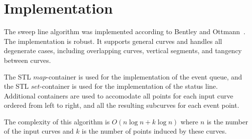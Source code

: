 \section{Implementation}

The sweep line algorithm was implemented according to Bentley and
Ottmann~\cite{bkos-cgaa-97}. The implementation is robust. It supports general
curves and handles all degenerate cases, including overlapping curves,
vertical segments, and tangency between curves.

The STL $map$-container is used for the implementation of the event queue, and
the STL $set$-container is used for the implementation of the status line.
Additional containers are used to accomodate all
 points for each input curve ordered from left
to right, and all the resulting subcurves for each event point. 

The complexity of this algorithm is $O(n\log{n} + k\log{n})$ where $n$ is the 
number of the input curves and $k$ is the number of
 points induced by these curves.

